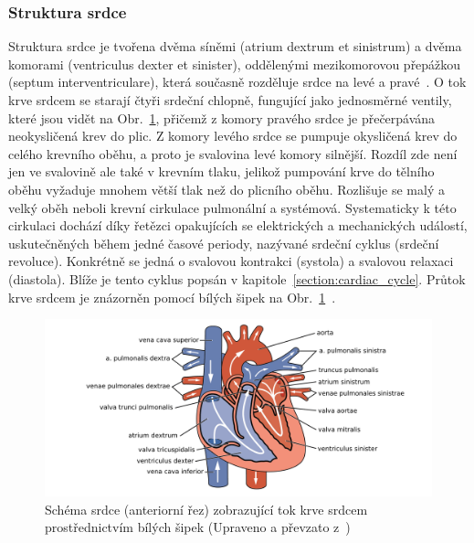 \subsubsection{Struktura srdce}
\label{section:heart_structure}
Struktura srdce je tvořena dvěma síněmi (atrium dextrum et sinistrum) a dvěma
komorami (ventriculus dexter et sinister), oddělenými mezikomorovou přepážkou
(septum interventriculare), která současně rozděluje srdce na levé a
pravé~\cite{Memorix2017}. O tok krve srdcem se starají čtyři srdeční chlopně,
fungující jako jednosměrné ventily, které jsou vidět na
Obr.~\ref{fig:heartanatomy}, přičemž z komory pravého srdce je přečerpávána
neokysličená krev do plic. Z komory levého srdce se pumpuje okysličená krev do
celého krevního oběhu, a proto je svalovina levé komory silnější. Rozdíl zde
není jen ve svalovině ale také v krevním tlaku, jelikož pumpování krve do
tělního oběhu vyžaduje mnohem větší tlak než do plicního oběhu. Rozlišuje se
malý a velký oběh neboli krevní cirkulace pulmonální a systémová. Systematicky k
této cirkulaci dochází díky řetězci opakujících se elektrických a mechanických
událostí, uskutečněných během jedné časové periody, nazývané srdeční cyklus
(srdeční revoluce). Konkrétně se jedná o svalovou kontrakci (systola) a svalovou
relaxaci (diastola). Blíže je tento cyklus popsán v
kapitole~\ref{section:cardiac_cycle}. Průtok krve srdcem je znázorněn pomocí
bílých šipek na Obr.~\ref{fig:heartanatomy}~\cite{Stejfa2006}.

\begin{figure}[h]
	\begin{center}
		\includegraphics[width=1\textwidth]{../assets/anatomy/heart}
		\caption{Schéma srdce (anteriorní řez) zobrazující tok krve srdcem
			prostřednictvím bílých šipek (Upraveno a převzato
			z~\cite{OpenStax})}
		\label{fig:heartanatomy}
	\end{center}
\end{figure}

